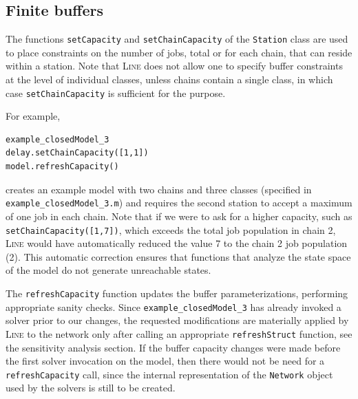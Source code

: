 \subsection{Finite buffers}
The functions \texttt{setCapacity} and \texttt{setChainCapacity} of the \texttt{Station} class are used to place constraints on the number of jobs, total or for each chain, that can reside within a station. Note that \textsc{Line} does not allow one to specify buffer constraints at the level of individual classes, unless chains contain a single class, in which case \texttt{setChainCapacity} is sufficient for the purpose.

For example,
\begin{lstlisting}
example_closedModel_3
delay.setChainCapacity([1,1])
model.refreshCapacity()
\end{lstlisting}
creates an example model with two chains and three classes (specified in \texttt{example\_closedModel\_3.m}) and requires the second station to accept a maximum of one job in each chain. Note that if we were to ask for a higher capacity, such as \texttt{setChainCapacity([1,7])}, which exceeds the total job population in chain 2, \textsc{Line} would have automatically reduced the value 7 to the chain 2 job population (2). This automatic correction ensures that functions that analyze the state space of the model do not generate unreachable states.

The \texttt{refreshCapacity} function updates the buffer parameterizations, performing appropriate sanity checks. Since \texttt{example\_closedModel\_3} has already invoked a solver prior to our changes, the requested modifications are materially applied by \textsc{Line} to the network only after calling an appropriate \texttt{refreshStruct} function, see the sensitivity analysis section. If the buffer capacity changes were made before the first solver invocation on the model, then there would not be need for a \texttt{refreshCapacity} call, since the internal representation of the \texttt{Network} object used by the solvers is still to be created.

